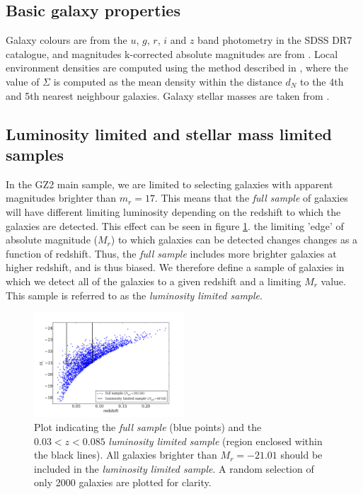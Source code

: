 \documentclass[useAMS,usenatbib]{mn2e}
\begin{document}
\subsection{Basic galaxy properties}

Galaxy colours are from the $u$, $g$, $r$, $i$ and $z$ band photometry in the SDSS DR7 catalogue, and magnitudes k-corrected absolute magnitudes are from \cite{Bamford_09}. Local environment densities are computed using the method described in \cite{Bamford_09,Baldry_06}, where the value of $\Sigma$ is computed as the mean density within the distance $d_N$ to the 4th and 5th nearest neighbour galaxies. Galaxy stellar masses are taken from \citep{Baldry_06}.

\subsection{Luminosity limited and stellar mass limited samples}
\label{sec:VLS}

In the GZ2 main sample, we are limited to selecting galaxies with apparent magnitudes brighter than $m_r = 17$.  This means that the \textit{full sample} of galaxies will have different limiting luminosity depending on the redshift to which the galaxies are detected. This effect can be seen in figure \ref{fig:vl_sample}. the limiting 'edge' of absolute magnitude ($M_r$) to which galaxies can be detected changes changes as a function of redshift. Thus, the \textit{full sample} includes more brighter galaxies at higher redshift, and is thus biased. We therefore define a sample of galaxies in which we detect all of the galaxies to a given redshift and a limiting $M_r$ value. This sample is referred to as the \textit{luminosity limited sample}.

\begin{figure}
		\centering
		
        \includegraphics[width=0.5\textwidth]{Data_imgs/volume_limited_sample.pdf}
		
        \caption{Plot indicating the \textit{full sample} (blue points) and the $0.03<z<0.085$ \textit{luminosity limited sample} (region enclosed within the black lines). All galaxies brighter than $M_r  = -21.01$ should be included in the \textit{luminosity limited sample}. A random selection of only 2000 galaxies are plotted for clarity.}
		
        \label{fig:vl_sample}
        
\end{figure}
\end{document}

